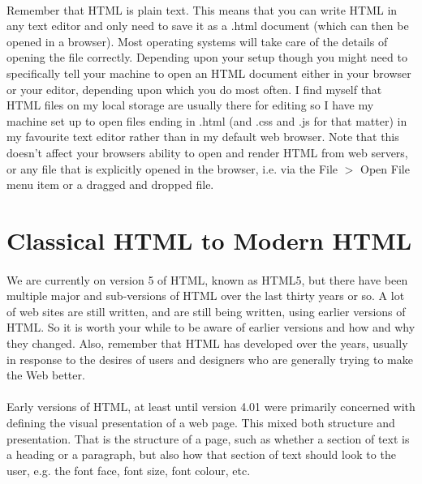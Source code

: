\paragraph{} Remember that HTML is plain text. This means that you can write HTML in any text editor and only need to save it as a .html document (which can then be opened in a browser).  Most operating systems will take care of the details of opening the file correctly. Depending upon your setup though you might need to specifically tell your machine to open an HTML document either in your browser or your editor, depending upon which you do most often. I find myself that HTML files on my local storage are usually there for editing so I have my machine set up to open files ending in .html (and .css and .js for that matter) in my favourite text editor rather than in my default web browser. Note that this doesn't affect your browsers ability to open and render HTML from web servers, or any file that is explicitly opened in the browser, i.e. via the File $>$ Open File menu item or a dragged and dropped file.

\section{Classical HTML to Modern HTML}
\paragraph{} We are currently on version 5 of HTML, known as HTML5, but there have been multiple major and sub-versions of HTML over the last thirty years or so. A lot of web sites are still written, and are still being written, using earlier versions of HTML. So it is worth your while to be aware of earlier versions and how and why they changed. Also, remember that HTML has developed over the years, usually in response to the desires of users and designers who are generally trying to make the Web better.
\paragraph{} Early versions of HTML, at least until version 4.01 were primarily concerned with defining the visual presentation of a web page. This mixed both structure and presentation. That is the structure of a page, such as whether a section of text is a heading or a paragraph, but also how that section of text should look to the user, e.g. the font face, font size, font colour, etc.
